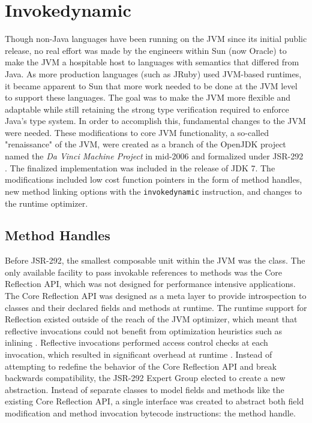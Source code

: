 \chapter{Invokedynamic}
\label{chapter:Invokedynamic}
\lhead{ \leftmark }

Though non-Java languages have been running on the JVM since its initial public release, no real effort was made by the engineers within Sun (now Oracle) to make the JVM a hospitable host to languages with semantics that differed from Java.  As more production languages (such as JRuby) used JVM-based runtimes, it became apparent to Sun that more work needed to be done at the JVM level to support these languages.  The goal was to make the JVM more flexible and adaptable while still retaining the strong type verification required to enforce Java's type system.  In order to accomplish this, fundamental changes to the JVM were needed.  These modifications to core JVM functionality, a so-called "renaissance" of the JVM, were created as a branch of the OpenJDK project named the \emph{Da Vinci Machine Project} in mid-2006 and formalized under JSR-292 \cite{jsr-292}.  The finalized implementation was included in the release of JDK 7.  The modifications included low cost function pointers in the form of method handles, new method linking options with the \texttt{invokedynamic} instruction, and changes to the runtime optimizer.

\section{Method Handles}

Before JSR-292, the smallest composable unit within the JVM was the class.  The only available facility to pass invokable references to methods was the Core Reflection API, which was not designed for performance intensive applications.  The Core Reflection API was designed as a meta layer to provide introspection to classes and their declared fields and methods at runtime.  The runtime support for Reflection existed outside of the reach of the JVM optimizer, which meant that reflective invocations could not benefit from optimization heuristics such as inlining \cite{jrose-methodhandles}.  Reflective invocations performed access control checks at each invocation, which resulted in significant overhead at runtime \cite{vmil09}.  Instead of attempting to redefine the behavior of the Core Reflection API and break backwards compatibility, the JSR-292 Expert Group elected to create a new abstraction.  Instead of separate classes to model fields and methods like the existing Core Reflection API, a single interface was created to abstract both field modification and method invocation bytecode instructions: the method handle.

